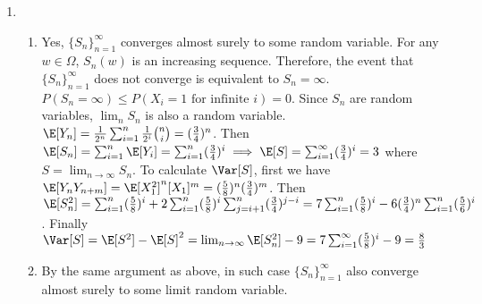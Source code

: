 \documentclass{article}
\begin{document}
\begin{enumerate}
\item 
\begin{enumerate}
    \item Yes, $\{S_n\}_{n=1}^{\infty}$ converges almost
    surely to some random variable. For any $w\in \Omega$,
    $S_n(w)$ is an increasing sequence. Therefore,
    the event that $\{S_n\}_{n=1}^{\infty}$ does not converge
    is equivalent to $S_n = \infty$.
    $P(S_n = \infty) \leq P(X_i=1 \textrm{ for infinite } i) = 0$. Since $S_n$ are random variables, $\lim_{n} S_n$ is also a random variable.
    $\E[Y_n]=\frac{1}{2^n}\sum_{i=1}^n \frac{1}{2^i}\binom{n}{i}=(\frac{3}{4})^n$. Then
    $\E[S_n]=\sum_{i=1}^n \E[Y_i] =\sum_{i=1}^n (\frac{3}{4})^i \implies \E[S]=\sum_{i=1}^{\infty} (\frac{3}{4})^i=3$ where $S=\lim_{n\to\infty} S_n$.
    To calculate $\Var[S]$, first we have
    $\E[Y_nY_{n+m}]=\E[X^2_1]^n[X_1]^m=(\frac{5}{8})^n(\frac{3}{4})^m$. Then $\E[S_n^2] = \sum_{i=1}^n (\frac{5}{8})^i
    + 2 \sum_{i=1}^n (\frac{5}{8})^i \sum_{j=i+1}^n
    (\frac{3}{4})^{j-i}=7\sum_{i=1}^n (\frac{5}{8})^i-6(\frac{3}{4})^{n}\sum_{i=1}^n (\frac{5}{6})^i$. Finally $\Var[S]=\E[S^2]-\E[S]^2=
    \lim_{n\to \infty} \E[S_n^2] - 9 = 
   7\sum_{i=1}^{\infty} (\frac{5}{8})^i-9=\frac{8}{3} $
   \item By the same argument as above, in such case
   $\{S_n\}_{n=1}^{\infty}$ also converge almost surely to some limit random variable.
\end{enumerate}
\end{enumerate}
\end{document}
